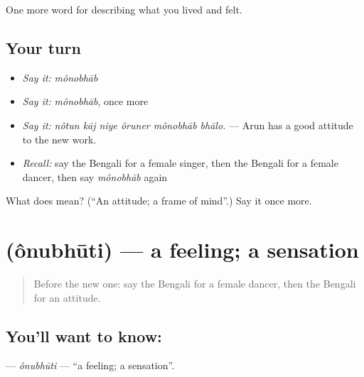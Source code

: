 \begin{grammarlens}[title={What you've built}]
One more word for describing what you lived and felt.
\end{grammarlens}

\subsection*{Your turn}
\begin{itemize}
\raggedright
  \item \emph{Say it:} \emph{mônobhāb}
  \item \emph{Say it:} \emph{mônobhāb}, once more
  \item \emph{Say it:} \emph{nôtun kāj niye ôruner mônobhāb bhālo.} — Arun has a good attitude to the new work.
  \item \emph{Recall:} say the Bengali for a female singer, then the Bengali for a female dancer, then say \emph{mônobhāb} again
\end{itemize}

\begin{tcolorbox}[breakable,colback=teal!4,colframe=teal!35!black,title={Before you move on}]
What does  mean? (\textquotedblleft{}An attitude; a frame of mind\textquotedblright{}.) Say it once more.
\end{tcolorbox}
\section[\texorpdfstring{\bn{অনুভূতি} (ônubhūti)}{অনুভূতি (ônubhūti)}]{ (ônubhūti) — a feeling; a sensation}

\label{lesson:BN-C438-onubhuti}



\begin{quote}
Before the new one: say the Bengali for a female dancer, then the Bengali for an attitude.
\end{quote}

\subsection*{You'll want to know: }
\textbf{} — \emph{ônubhūti} — \textquotedblleft{}a feeling; a sensation\textquotedblright{}.

\begin{quote}
       
\end{quote}

